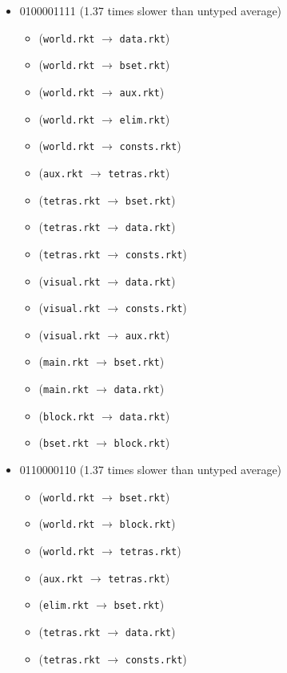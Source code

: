 \documentclass{article}
\newcommand{\mono}[1]{\texttt{#1}}
\begin{document}
\begin{itemize}
\begin{itemize}
  \end{itemize}
\item 0100001111 (1.37 times slower than untyped average)
  \begin{itemize}
  \item (\mono{world.rkt} $\rightarrow$ \mono{data.rkt})
  \item (\mono{world.rkt} $\rightarrow$ \mono{bset.rkt})
  \item (\mono{world.rkt} $\rightarrow$ \mono{aux.rkt})
  \item (\mono{world.rkt} $\rightarrow$ \mono{elim.rkt})
  \item (\mono{world.rkt} $\rightarrow$ \mono{consts.rkt})
  \item (\mono{aux.rkt} $\rightarrow$ \mono{tetras.rkt})
  \item (\mono{tetras.rkt} $\rightarrow$ \mono{bset.rkt})
  \item (\mono{tetras.rkt} $\rightarrow$ \mono{data.rkt})
  \item (\mono{tetras.rkt} $\rightarrow$ \mono{consts.rkt})
  \item (\mono{visual.rkt} $\rightarrow$ \mono{data.rkt})
  \item (\mono{visual.rkt} $\rightarrow$ \mono{consts.rkt})
  \item (\mono{visual.rkt} $\rightarrow$ \mono{aux.rkt})
  \item (\mono{main.rkt} $\rightarrow$ \mono{bset.rkt})
  \item (\mono{main.rkt} $\rightarrow$ \mono{data.rkt})
  \item (\mono{block.rkt} $\rightarrow$ \mono{data.rkt})
  \item (\mono{bset.rkt} $\rightarrow$ \mono{block.rkt})
  \end{itemize}
\item 0110000110 (1.37 times slower than untyped average)
  \begin{itemize}
  \item (\mono{world.rkt} $\rightarrow$ \mono{bset.rkt})
  \item (\mono{world.rkt} $\rightarrow$ \mono{block.rkt})
  \item (\mono{world.rkt} $\rightarrow$ \mono{tetras.rkt})
  \item (\mono{aux.rkt} $\rightarrow$ \mono{tetras.rkt})
  \item (\mono{elim.rkt} $\rightarrow$ \mono{bset.rkt})
  \item (\mono{tetras.rkt} $\rightarrow$ \mono{data.rkt})
  \item (\mono{tetras.rkt} $\rightarrow$ \mono{consts.rkt})

\end{itemize}
\end{itemize}
\end{document}
